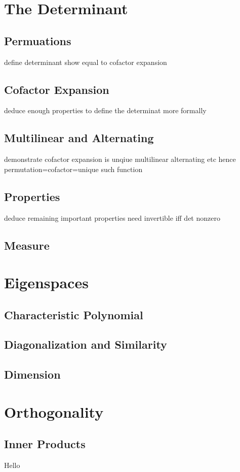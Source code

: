 \documentclass[oneside, 12pt]{book}
\theoremstyle{definition}
\begin{document}
\chapter{The Determinant}
\section{Permuations}
define determinant
show equal to cofactor expansion
\section{Cofactor Expansion}
deduce enough properties to define the determinat more formally
\section{Multilinear and Alternating}
demonstrate cofactor expansion is unqiue multilinear alternating etc
hence permutation=cofactor=unique such function
\section{Properties}
deduce remaining important properties
need invertible iff det nonzero
\section{Measure}
\chapter{Eigenspaces}
\section{Characteristic Polynomial}
\section{Diagonalization and Similarity}
\section{Dimension}
\chapter{Orthogonality}
\section{Inner Products}
Hello
\end{document}
